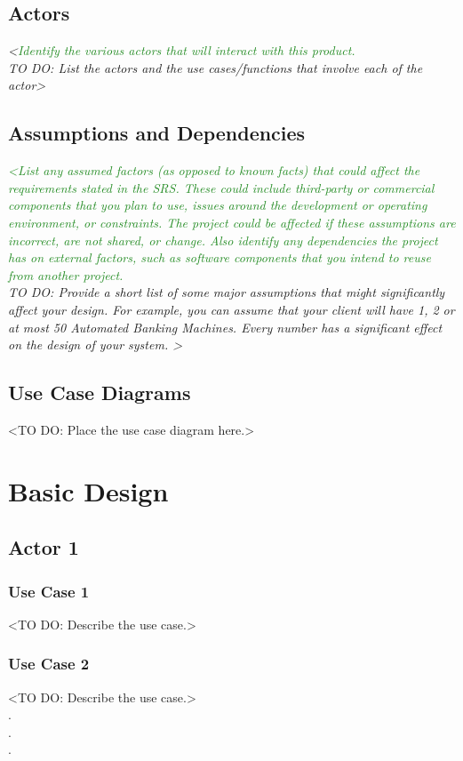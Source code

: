 \documentclass[12pt,a4paper]{report}
\begin{document}
\section{Actors}
\textit{<\textcolor{ForestGreen}{Identify the various actors that will interact with this product.} \\
TO DO: List the actors and the use cases/functions that involve each of the actor>}

\section{Assumptions and Dependencies}
\textit{\textcolor{ForestGreen}{<List any assumed factors (as opposed to known facts) that could affect the requirements stated in
the SRS. These could include third-party or commercial components that you plan to use, issues
around the development or operating environment, or constraints. The project could be affected if
these assumptions are incorrect, are not shared, or change. Also identify any dependencies the
project has on external factors, such as software components that you intend to reuse from another
project.} \\
TO DO: Provide a short list of some major assumptions that might significantly affect your design.
For example, you can assume that your client will have 1, 2 or at most 50 Automated Banking
Machines. Every number has a significant effect on the design of your system. >}

\section{Use Case Diagrams}
<TO DO: Place the use case diagram here.>
\chapter{Basic Design}
\section{Actor 1}
\subsection{Use Case 1}
<TO DO: Describe the use case.>
\subsection{Use Case 2}
<TO DO: Describe the use case.> \\
\hspace*{3cm} . \\
\hspace*{3cm} . \\
\hspace*{3cm} .
\end{document}
